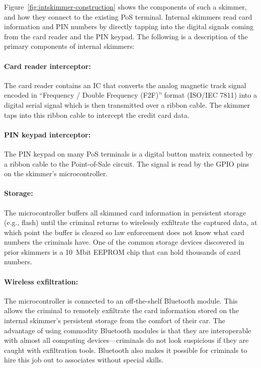 Figure~\ref{fig:intskimmer-construction} shows the components of such a
skimmer, and how they connect to the existing PoS terminal.
%
Internal skimmers read card information and PIN numbers by directly tapping into
the digital signals coming from the card reader and the PIN keypad.
%
The following is a description of the primary components of internal skimmers:
 
\paragraph{Card reader interceptor:}
%
The card reader contains an IC that converts the analog magnetic track signal encoded in ``Frequency
/ Double Frequency (F2F)'' format (ISO/IEC 7811) into a digital serial signal which is
then transmitted over a ribbon cable. The skimmer taps into this ribbon cable to intercept the credit card data.

\paragraph{PIN keypad interceptor:}
%
The PIN keypad on many PoS terminals is a digital button matrix 
connected by a ribbon cable to the Point-of-Sale circuit.
%
The signal is read
by the GPIO pins on the skimmer's microcontroller.

\paragraph{Storage:}
%
The microcontroller buffers all skimmed card information in persistent storage
(e.g., flash) until the criminal returns to wirelessly exfiltrate the captured
data, at which point the buffer is cleared so law enforcement does not know
what card numbers the criminals have.
%
One of the common storage devices discovered in prior skimmers is a
10~Mbit EEPROM chip that can hold thousands of card numbers.

\paragraph{Wireless exfiltration:}
%
The microcontroller is connected to an off-the-shelf Bluetooth module.
%
This allows the criminal to remotely exfiltrate the card information stored on
the internal skimmer's persistent storage from the comfort of their car.
%
The advantage of using commodity Bluetooth modules is that they are
interoperable with almost all computing devices---criminals do not look
suspicious if they are caught with exfiltration tools.
%
Bluetooth also makes it possible for criminals to hire this job out to associates without special skills.

